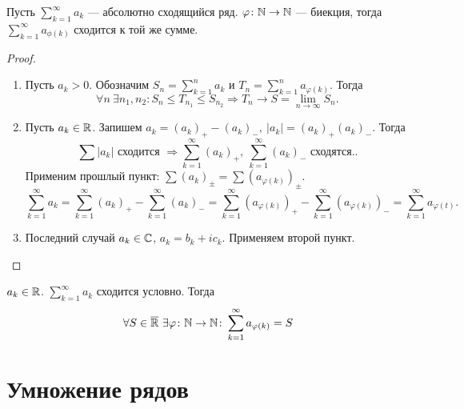\begin{thm}
    Пусть $ \sum_{k=1}^{\infty}a_k $ --- абсолютно сходящийся ряд.
    $ \varphi \colon \mathbb{N} \to \mathbb{N}$ --- биекция, тогда 
	$ \sum_{k=1}^{\infty} a_{\phi(k)}$ сходится к той же сумме.
\end{thm}
\begin{proof}
    $ $
    \begin{enumerate}
	\item Пусть $ a_k > 0$. Обозначим  $ S_n = \sum_{k=1}^{n} a_k$ и $ T_n = \sum_{k=1}^{n} a_{\varphi(k)}$.
		Тогда
	    \[
	    \forall  n ~ \exists  n_1, n_2 \colon S_n \le T_{n_1} \le S_{n_2} \Longrightarrow T_n \to  S
		= \lim_{n \to \infty} S_n
	    .\] 

	\item Пусть $ a_k \in  \mathbb{R}$. Запишем $ a_k = (a_k)_+ - (a_k)_-, ~ \lvert a_k \rvert  = (a_k)_+ (a_k)_-$.
	    Тогда 
	    \[
		\sum{\lvert a_k \rvert }  \text{ сходится } \Longrightarrow   \sum_{k=1}^{\infty} (a_k)_+, ~\sum_{k=1}^{\infty} (a_k)_- \text{ сходятся}.
	    .\] 
	    Применим прошлый пункт: $ \sum{(a_k)_\pm}  = \sum(a_{\varphi(k)})_\pm  $.
	    \[
		\sum_{k=1}^{\infty} a_k = \sum_{k=1}^{\infty}(a_k)_+ - \sum_{k=1}^{\infty} (a_k)_- = \sum_{k=1}^{\infty} (a_{ \varphi (k)})_+ - \sum_{k=1}^{\infty} (a_{ \varphi (k)})_- = \sum_{k=1}^{\infty}  a_{ \varphi (t)}  
	    .\] 
	\item Последний случай $ a_k \in \mathbb{C}$, $ a_ k= b_k + i c_k$. Применяем второй пункт.
    \end{enumerate}
\end{proof}

\begin{thm}
    $ a_k \in  \mathbb{R}$. $ \sum_{k=1}^{\infty} a_k$ сходится условно. Тогда $$ \forall S \in  \overline{\mathbb{R}} ~ \exists \varphi  \colon \mathbb{N} \to \mathbb{N} \colon \sum_{k=1}^{\infty} a_{\varphi(k)} = S
    $$
\end{thm}
\section{Умножение рядов}

